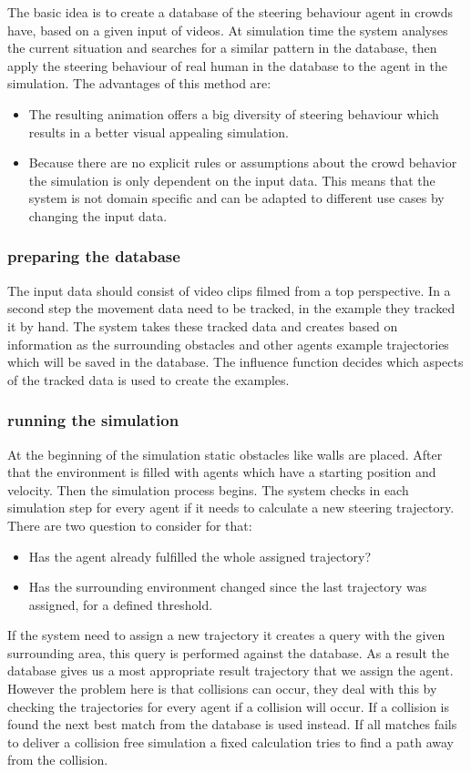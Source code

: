 \documentclass{acmsiggraph}               %
\begin{document}
The basic idea is to create a database of the steering behaviour agent in crowds have, based on a given input of videos. At simulation time the system analyses the current situation and searches for a similar pattern in the database, then apply the steering behaviour of real human in the database to the agent in the simulation. The advantages of this method are: 
\begin{itemize}
    \item The resulting animation offers a big diversity of steering behaviour which results in a better visual appealing simulation.
    \item Because there are no explicit rules or assumptions about the crowd behavior the simulation is only dependent on the input data. This means that the system is not domain specific and can be adapted to different use cases by changing the input data.
\end{itemize}

\subsubsection{preparing the database}
The input data should consist of video clips filmed from a top perspective. In a second step the movement data need to be tracked, in the example they tracked it by hand.
The system takes these tracked data and creates based on information as the surrounding obstacles and other agents example trajectories which will be saved in the database. The influence function decides which aspects of the tracked data is used to create the examples. 

\subsubsection{running the simulation}
At the beginning of the simulation static obstacles like walls are placed. After that the environment is filled with agents which have a starting position and velocity. Then the simulation process begins.
The system checks in each simulation step for every agent if it needs to calculate a new steering trajectory. There are two question to consider for that: 
\begin{itemize}
    \item Has the agent already fulfilled the whole assigned trajectory?
    \item Has the surrounding environment changed since the last trajectory was assigned, for a defined threshold.
\end{itemize}
If the system need to assign a new trajectory it creates a query with the given surrounding area, this query is performed against the database. As a result the database gives us a most appropriate result trajectory that we assign the agent. 
However the problem here is that collisions can occur, they deal with this by checking the trajectories for every agent if a collision will occur. If a collision is found the next best match from the database is used instead. If all matches fails to deliver a collision free simulation a fixed calculation tries to find a path away from the collision. 
\end{document}

